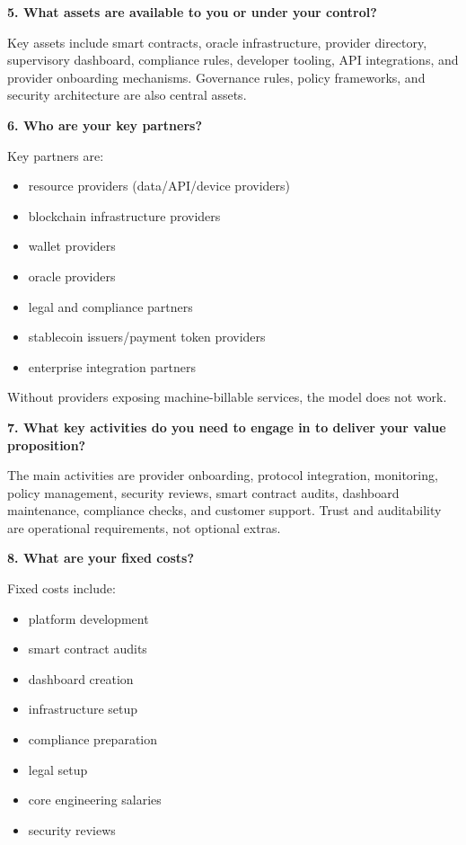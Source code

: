 \documentclass[12pt,a4paper,oneside]{article}
\theoremstyle{definition}
\theoremstyle{plain}
\begin{document}
\vspace{0.5em}

\textbf{5. What assets are available to you or under your control?}

Key assets include smart contracts, oracle infrastructure, provider directory, supervisory dashboard, compliance rules, developer tooling, API integrations, and provider onboarding mechanisms. Governance rules, policy frameworks, and security architecture are also central assets.

\vspace{0.5em}

\textbf{6. Who are your key partners?}

Key partners are:
\begin{itemize}
    \item resource providers (data/API/device providers)
    \item blockchain infrastructure providers
    \item wallet providers
    \item oracle providers
    \item legal and compliance partners
    \item stablecoin issuers/payment token providers
    \item enterprise integration partners
\end{itemize}

Without providers exposing machine-billable services, the model does not work.

\vspace{0.5em}

\textbf{7. What key activities do you need to engage in to deliver your value proposition?}

The main activities are provider onboarding, protocol integration, monitoring, policy management, security reviews, smart contract audits, dashboard maintenance, compliance checks, and customer support. Trust and auditability are operational requirements, not optional extras.

\vspace{0.5em}

\textbf{8. What are your fixed costs?}

Fixed costs include:

\begin{itemize}
    \item platform development
    \item smart contract audits
    \item dashboard creation
    \item infrastructure setup
    \item compliance preparation
    \item legal setup
    \item core engineering salaries
    \item security reviews
\end{itemize}
\end{document}
